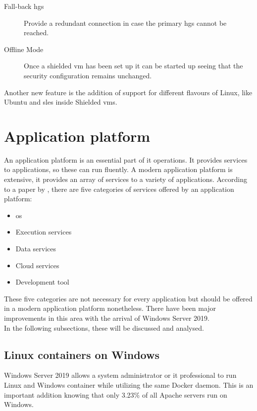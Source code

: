 \begin{description}
	\item[Fall-back \acrshort{hgs}] Provide a redundant connection in case the primary \acrshort{hgs} cannot be reached.
	\item[Offline Mode] Once a shielded \acrshort{vm} has been set up it can be started up seeing that the security configuration remains unchanged.
\end{description}

Another new feature is the addition of support for different flavours of Linux, like Ubuntu and \acrfull{sles} inside Shielded \acrshort{vm}s. 

\clearpage

\section{Application platform}
An application platform is an essential part of \acrshort{it} operations. 
It provides services to applications, so these can run fluently. 
A modern application platform is extensive, it provides an array of services to a variety of applications. 
According to a paper by \textcite{Chappell2011}, there are five categories of services offered by an application platform:

\begin{itemize}
	\item \acrshort{os}
	\item Execution services
	\item Data services
	\item Cloud services
	\item Development tool
\end{itemize}

These five categories are not necessary for every application but should be offered in a modern application platform nonetheless.
There have been major improvements in this area with the arrival of Windows Server 2019. \autocite{Gerend2018} 
\\
In the following subsections, these will be discussed and analysed.

\subsection*{Linux containers on Windows}
Windows Server 2019 allows a system administrator or \acrshort{it} professional to run Linux and Windows container while utilizing the same Docker daemon. 
This is an important addition knowing that only 3.23\% of all Apache servers run on Windows. \autocite{SecuritySpace2019}
